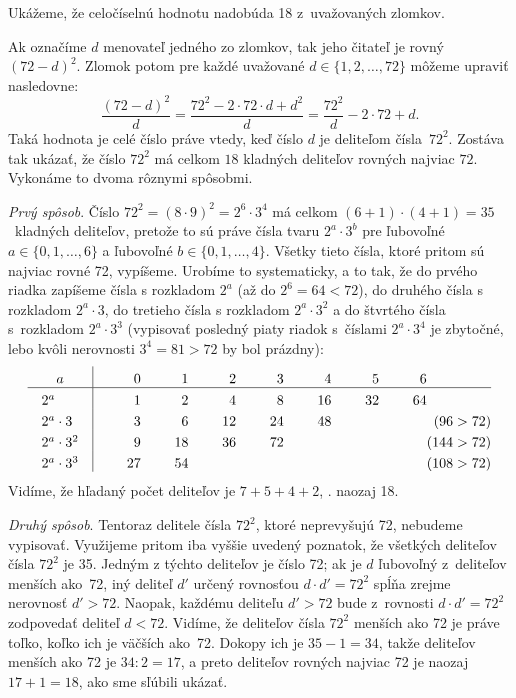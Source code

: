 {%
Ukážeme, že celočíselnú hodnotu nadobúda 18 z~uvažovaných zlomkov.

Ak označíme $d$ menovateľ jedného zo zlomkov,
tak jeho čitateľ je rovný $(72-d)^2$.
Zlomok potom pre každé uvažované $d\in\{1,2,\dots,72\}$
môžeme upraviť nasledovne:
$$
\frac{(72-d)^2}{d} = \frac{72^2 - 2\cdot 72\cdot d + d^2}{d} =
\frac{72^2}d - 2\cdot 72 + d.
$$
Taká hodnota je celé číslo práve vtedy, keď číslo $d$ je deliteľom
čísla~$72^2$. Zostáva tak ukázať, že číslo $72^2$
má celkom $18$ kladných deliteľov rovných najviac $72$.
Vykonáme to dvoma rôznymi spôsobmi.

\smallskip\noindent
\emph{Prvý spôsob}.
Číslo ${72^2=(8\cdot 9)^2= 2^6\cdot 3^4}$ má celkom ${(6+1)\cdot
(4+1)=35}$~kladných deliteľov, pretože to sú práve čísla tvaru
${2^{a}\cdot3^{b}}$
pre ľubovoľné ${a\in\{0,1,\dots,6\}}$ a ľubovoľné
${b\in\{0,1,\dots,4\}}$. Všetky tieto čísla, ktoré pritom sú
najviac rovné 72, vypíšeme. Urobíme to systematicky, a to
tak,
že do prvého riadka zapíšeme čísla s rozkladom $2^a$ (až do $2^6=64<72$),
do druhého čísla s rozkladom $2^a\cdot3$, do tretieho čísla s rozkladom
$2^a\cdot3^2$ a do štvrtého čísla s~rozkladom $2^a\cdot3^3$
(vypisovať posledný piaty riadok s~číslami $2^a\cdot3^4$ je zbytočné,
lebo kvôli nerovnosti $3^4=81>72$ by bol prázdny):
$$\vbox{\offinterlineskip
\halign{\vrule depth 3pt height 12pt width0pt\quad$#$\quad\hss\vrule&\hbox to 12mm{\hss$#$}&\hbox to 12mm{\hss$#$}&\hbox to 12mm{ \hss$#$}&\hbox to 12mm{\hss$#$}&\hbox to 12mm{\hss$#$}&\hbox to 12mm{\hss$#$}&\hbox to 12mm{\hss $#$}&\hss$#$\cr
\hfill a\hfill &0&1&2&3&4&5&6&\cr
\noalign{\hrule}
2^a&1&2&4&8&16&32&64&\cr
2^a\cdot3&3&6&12&24&48&&&(96>72)\cr
2^a\cdot3^2&9&18&36&72&&&&(144>72)\cr
2^a\cdot3^3&27&54&&&&&&(108>72)\cr
}}$$
Vidíme, že hľadaný počet deliteľov je $7+5+4+2$, \tj. naozaj 18.

\smallskip\noindent
\emph{Druhý spôsob}. Tentoraz delitele čísla $72^2$, ktoré
neprevyšujú 72, nebudeme vypisovať. Využijeme pritom iba
vyššie uvedený poznatok, že všetkých deliteľov čísla $72^2$ je 35.
Jedným z týchto deliteľov je číslo 72; ak je $d$ ľubovoľný
z~deliteľov menších ako~72, iný deliteľ $d'$
určený rovnosťou ${d\cdot d'=72^2}$ spĺňa zrejme nerovnosť
${d'>72}$. Naopak, každému deliteľu ${d'>72}$ bude z~rovnosti
${d\cdot d'=72^2}$ zodpovedať deliteľ ${d<72}$. Vidíme, že
deliteľov čísla $72^2$ menších ako 72 je práve toľko, koľko ich je
väčších ako~72. Dokopy ich je ${35-1=34}$, takže deliteľov
menších ako 72 je ${34:2=17}$, a preto deliteľov rovných najviac 72
je naozaj ${17+1=18}$, ako sme sľúbili ukázať.

}
